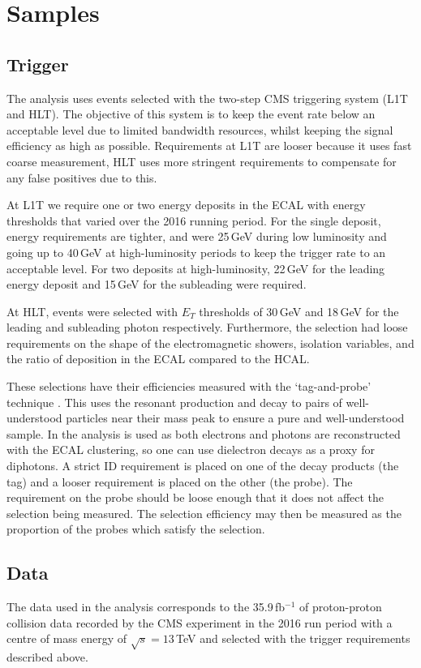 \section{Samples}

\subsection{Trigger}
The analysis uses events selected with the two-step CMS triggering system (L1T and HLT). The objective of this system is to keep the event rate below an acceptable level due to limited bandwidth resources, whilst keeping the signal efficiency as high as possible. Requirements at L1T are looser because it uses fast coarse measurement, HLT uses more stringent requirements to compensate for any false positives due to this.

At L1T we require one or two energy deposits in the ECAL with energy thresholds that varied over the 2016 running period. For the single deposit, energy requirements are tighter, and were 25\,GeV during low luminosity and going up to 40\,GeV at high-luminosity periods to keep the trigger rate to an acceptable level. For two deposits at high-luminosity, 22\,GeV for the leading energy deposit and 15\,GeV for the subleading were required. 

At HLT, events were selected with $E_{T}$ thresholds of 30\,GeV and 18\,GeV for the leading and subleading photon respectively. 
Furthermore, the selection had loose requirements on the shape of the electromagnetic showers, isolation variables, and the ratio of deposition in the ECAL compared to the HCAL. 

These selections have their efficiencies measured with the `tag-and-probe' technique \cite{TagAndProbe}. 
This uses the resonant production and decay to pairs of well-understood particles near their mass peak to ensure a pure and well-understood sample. 
In the \Hgg analysis \Zee is used as both electrons and photons are reconstructed with the ECAL clustering, so one can use dielectron decays as a proxy for diphotons. 
A strict ID requirement is placed on one of the decay products (the tag) and a looser requirement is placed on the other (the probe). 
The requirement on the probe should be loose enough that it does not affect the selection being measured. The selection efficiency may then be measured as the proportion of the probes which satisfy the selection.


\subsection{Data}
The data used in the analysis corresponds to the 35.9\,fb$^{-1}$ of proton-proton collision data recorded by the CMS experiment in the 2016 run period with a centre of mass energy of $\sqrt{s}=13$\,TeV and selected with the trigger requirements described above. 



